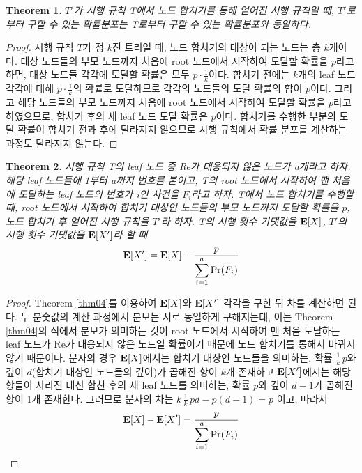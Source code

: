 \documentclass[11pt]{article}
\newtheorem{theorem}{Theorem}
\begin{document}
\singlespacing
\begin{theorem}
$T'$가 시행 규칙 T에서 노드 합치기를 통해 얻어진 시행 규칙일 때, $T'$로부터 구할 수 있는 확률분포는 T로부터 구할 수 있는 확률분포와 동일하다.
\label{thm05}
\end{theorem}
\doublespacing

\begin{proof}
시행 규칙 $T$가 정 $k$진 트리일 때, 노드 합치기의 대상이 되는 노드는 총 $k$개이다. 대상 노드들의 부모 노드까지 처음에 root 노드에서 시작하여 도달할 확률을 $p$라고 하면, 대상 노드들 각각에 도달할 확률은 모두 $p\cdot\frac{1}{k}$이다. 합치기 전에는 $k$개의 leaf 노드 각각에 대해 $p\cdot\frac{1}{k}$의 확률로 도달하므로 각각의 노드들의 도달 확률의 합이 $p$이다. 그리고 해당 노드들의 부모 노드까지 처음에 root 노드에서 시작하여 도달할 확률을 $p$라고 하였으므로, 합치기 후의 새 leaf 노드 도달 확률은 $p$이다. 합치기를 수행한 부분의 도달 확률이 합치기 전과 후에 달라지지 않으므로 시행 규칙에서 확률 분포를 계산하는 과정도 달라지지 않는다.
\end{proof}

\singlespacing
\begin{theorem}
시행 규칙 T의 leaf 노드 중 Re가 대응되지 않은 노드가 a개라고 하자. 해당 leaf 노드들에 1부터 a까지 번호를 붙이고, T의 root 노드에서 시작하여 맨 처음에 도달하는 leaf 노드의 번호가 i인 사건을 $F_{i}$라고 하자. T에서 노드 합치기를 수행할 때, root 노드에서 시작하여 합치기 대상인 노드들의 부모 노드까지 도달할 확률을 $p$, 노드 합치기 후 얻어진 시행 규칙을 $T'$라 하자. T의 시행 횟수 기댓값을 $\textnormal{\textbf{E}}[X]$, $T'$의 시행 횟수 기댓값을 $\textnormal{\textbf{E}}[X']$라 할 때
\[\textnormal{\textbf{E}}[X'] = \textnormal{\textbf{E}}[X] - \frac{p}{\displaystyle \sum_{i=1}^{a} \textnormal{Pr}(F_{i})}\]
\label{thm06}
\end{theorem}
\doublespacing

\begin{proof}
Theorem \ref{thm04}를 이용하여 $\textnormal{\textbf{E}}[X]$와 $\textnormal{\textbf{E}}[X']$ 각각을 구한 뒤 차를 계산하면 된다. 두 분숫값의 계산 과정에서 분모는 서로 동일하게 구해지는데, 이는 Theorem \ref{thm04}의 식에서 분모가 의미하는 것이 root 노드에서 시작하여 맨 처음 도달하는 leaf 노드가 Re가 대응되지 않은 노드일 확률이기 때문에 노드 합치기를 통해서 바뀌지 않기 때문이다. 분자의 경우 $\textnormal{\textbf{E}}[X]$에서는 합치기 대상인 노드들을 의미하는, 확률 $\displaystyle \frac{1}{k}\,p$와 깊이 $d$(합치기 대상인 노드들의 깊이)가 곱해진 항이 $k$개 존재하고 $\textnormal{\textbf{E}}[X']$에서는 해당 항들이 사라진 대신 합친 후의 새 leaf 노드를 의미하는, 확률 $p$와 깊이 $d-1$가 곱해진 항이 1개 존재한다. 그러므로 분자의 차는 $k\,\displaystyle \frac{1}{k}\,pd - p(d-1) = p$ 이고, 따라서
\[\textnormal{\textbf{E}}[X] - \textnormal{\textbf{E}}[X'] = \frac{p}{\displaystyle \sum_{i=1}^{a} \textnormal{Pr}(F_{i})}\]
\end{proof}
\end{document}
